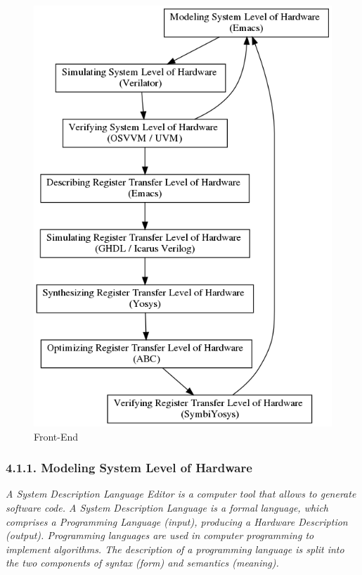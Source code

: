 \documentclass[]{article}
\begin{document}
\begin{figure}
\centering
\includegraphics{../doc/front-end.png}
\caption{Front-End}
\end{figure}

\subsubsection{4.1.1. Modeling System Level of
Hardware}\label{modeling-system-level-of-hardware}

\emph{A System Description Language Editor is a computer tool that
allows to generate software code. A System Description Language is a
formal language, which comprises a Programming Language (input),
producing a Hardware Description (output). Programming languages are
used in computer programming to implement algorithms. The description of
a programming language is split into the two components of syntax (form)
and semantics (meaning).}
\end{document}
